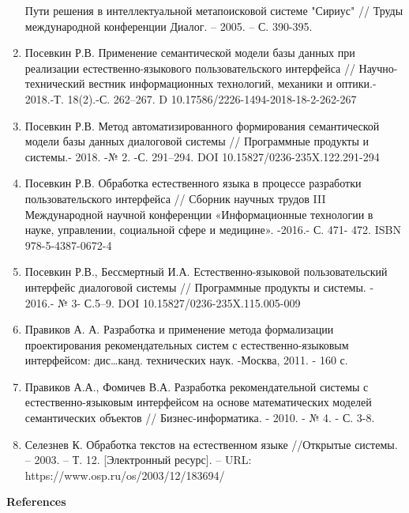 \begin{noparindent}
\begin{enumerate}
  Пути решения в интеллектуальной метапоисковой системе "Сириус" //
  Труды международной конференции Диалог. -- 2005. -- С. 390-395.
\item
  Посевкин Р.В. Применение семантической модели базы данных при
  реализации естественно-языкового пользовательского интерфейса //
  Научно-технический вестник информационных технологий, механики и
  оптики.- 2018.-Т. 18(2).-С. 262--267.
  D 10.17586/2226-1494-2018-18-2-262-267
\item
  Посевкин Р.В. Метод автоматизированного формирования семантической
  модели базы данных диалоговой системы // Программные продукты и
  системы.- 2018. -№ 2. -С. 291--294. DOI 10.15827/0236-235X.122.291-294
\item
  Посевкин Р.В. Обработка естественного языка в процессе разработки
  пользовательского интерфейса // Сборник научных трудов III
  Международной научной конференции «Информационные технологии в науке,
  управлении, социальной сфере и медицине». -2016.- С. 471- 472. ISBN
  978-5-4387-0672-4
\item
  Посевкин Р.В., Бессмертный И.А. Естественно-языковой пользовательский
  интерфейс диалоговой системы // Программные продукты и системы. -
  2016.- № 3- С.5--9. DOI 10.15827/0236-235X.115.005-009
\item
  Правиков А. А. Разработка и применение метода формализации
  проектирования рекомендательных систем с естественно-языковым
  интерфейсом: дис\ldots канд. технических наук. -Москва, 2011. - 160 с.
\item
  Правиков А.А., Фомичев В.А. Разработка рекомендательной системы с
  естественно-языковым интерфейсом на основе математических моделей
  семантических объектов // Бизнес-информатика. - 2010. - № 4. - С. 3-8.
\item
  Селезнев К. Обработка текстов на естественном языке //Открытые
  системы. -- 2003. -- Т. 12. {[}Электронный ресурс{]}. -- URL:
  https://www.osp.ru/os/2003/12/183694/
\end{enumerate}
\end{noparindent}


\begin{center}
  {\bfseries References}
  \end{center}


